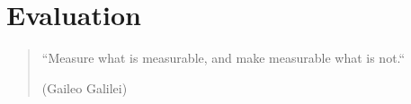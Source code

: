 
\chapter{Evaluation} \label{chapter:evaluation}

\begin{quotation}
``Measure what is measurable, and make measurable what is not.``
\begin{flushright}
(Gaileo Galilei)
\end{flushright}
\end{quotation}


